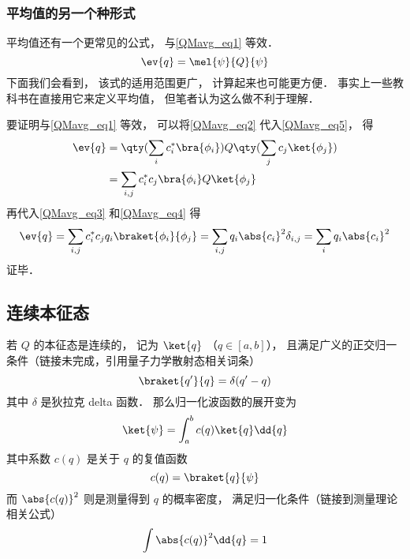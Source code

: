 \subsubsection{平均值的另一个种形式}
平均值还有一个更常见的公式， 与\autoref{QMavg_eq1} 等效．
\begin{equation}\label{QMavg_eq5}
\ev{q} = \mel{\psi}{Q}{\psi}
\end{equation}
下面我们会看到， 该式的适用范围更广， 计算起来也可能更方便． 事实上一些教科书在直接用它来定义平均值， 但笔者认为这么做不利于理解．

要证明与\autoref{QMavg_eq1} 等效， 可以将\autoref{QMavg_eq2} 代入\autoref{QMavg_eq5}， 得
\begin{equation}
\begin{aligned}
\ev{q} &= \qty(\sum_i c_i^* \bra{\phi_i}) Q \qty(\sum_j c_j \ket{\phi_j})\\
&= \sum_{i,j} c_i^* c_j \bra{\phi_i} Q \ket{\phi_j}
\end{aligned} 
\end{equation}
再代入\autoref{QMavg_eq3} 和\autoref{QMavg_eq4} 得
\begin{equation}
\ev{q} = \sum_{i,j} c_i^* c_j q_i \braket{\phi_i}{\phi_j}
= \sum_{i,j} q_i \abs{c_i}^2 \delta_{i,j} = \sum_i q_i \abs{c_i}^2
\end{equation}
证毕．

\subsection{连续本征态}

若 $Q$ 的本征态是连续的， 记为 $\ket{q}$ （$q\in [a,b]$）， 且满足广义的正交归一条件（链接未完成，引用量子力学散射态相关词条）
\begin{equation}\label{QMavg_eq9}
\braket{q'}{q} = \delta(q'-q)
\end{equation}
其中 $\delta$ 是狄拉克 delta 函数． 那么归一化波函数的展开变为
\begin{equation}\label{QMavg_eq7}
\ket{\psi} = \int_a^b c(q) \ket{q} \dd{q}
\end{equation}
其中系数 $c(q)$ 是关于 $q$ 的复值函数
\begin{equation}\label{QMavg_eq10}
c(q) = \braket{q}{\psi}
\end{equation}
而 $\abs{c(q)}^2$ 则是测量得到 $q$ 的概率密度， 满足归一化条件（链接到测量理论 相关公式）
\begin{equation}
\int \abs{c(q)}^2 \dd{q} = 1
\end{equation}

